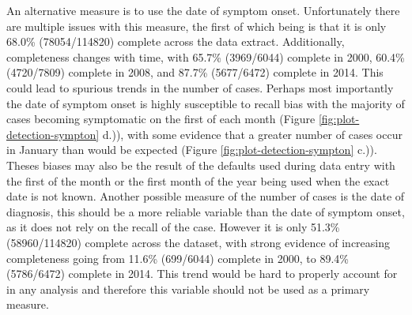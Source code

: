 \documentclass[11pt,twoside]{bristolthesis}
\begin{document}
  An alternative measure is to use the date of symptom onset. Unfortunately there are multiple issues with this measure, the first of which being is that it is only 68.0\% (78054/114820) complete across the data extract. Additionally, completeness changes with time, with 65.7\% (3969/6044) complete in 2000, 60.4\% (4720/7809) complete in 2008, and 87.7\% (5677/6472) complete in 2014. This could lead to spurious trends in the number of cases. Perhaps most importantly the date of symptom onset is highly susceptible to recall bias with the majority of cases becoming symptomatic on the first of each month (Figure \ref{fig:plot-detection-sympton} d.)), with some evidence that a greater number of cases occur in January than would be expected (Figure \ref{fig:plot-detection-sympton} c.)). Theses biases may also be the result of the defaults used during data entry with the first of the month or the first month of the year being used when the exact date is not known. Another possible measure of the number of cases is the date of diagnosis, this should be a more reliable variable than the date of symptom onset, as it does not rely on the recall of the case. However it is only 51.3\% (58960/114820) complete across the dataset, with strong evidence of increasing completeness going from 11.6\% (699/6044) complete in 2000, to 89.4\% (5786/6472) complete in 2014. This trend would be hard to properly account for in any analysis and therefore this variable should not be used as a primary measure.
\end{document}

